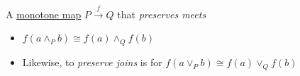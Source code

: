 A \hyperref[D1.59]{monotone map} $P \xrightarrow{f} Q$ that \emph{preserves meets}

\begin{itemize}
    \item  $f(a \land_P b) \cong f(a) \land_Q f(b)$
    \item Likewise, to \emph{preserve joins} is for $f(a \lor_P b) \cong f(a) \lor_Q f(b)$
  \end{itemize}
